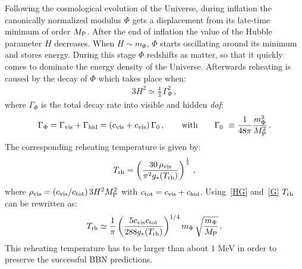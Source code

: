 \documentclass[12pt,a4paper]{book}
\begin{document}
Following the cosmological evolution of the Universe, during inflation the canonically normalized modulus $\Phi$ gets a displacement from its late-time minimum of order $M_{\rm P}$. After the end of inflation the value of the Hubble parameter $H$ decreases. When $H \sim m_\Phi$, $\Phi$ starts oscillating around its minimum and stores energy. During this stage $\Phi$ redshifts as matter, so that it quickly comes to dominate the energy density of the Universe. Afterwards reheating is caused by the decay of $\Phi$ which takes place when:
\begin{align}
3 H^2 \simeq \frac43 \,\Gamma_\Phi^2\,,
\label{HG}
\end{align}
where $\Gamma_\Phi$ is the total decay rate into visible and hidden \textit{dof}:
\begin{align}
\Gamma_\Phi = \Gamma_{\rm vis} + \Gamma_{\rm hid} = \left(c_{\rm vis} + c_{\rm vis}\right) \Gamma_0\,,\qquad\text{with} \qquad \Gamma_0~\equiv \frac{1}{48\pi}\frac{m_\Phi^3}{M_{\rm P}^2}\,.
\label{G}
\end{align}
The corresponding reheating temperature is given by:
\begin{align} 
T_{\rm rh} = \left(\frac{30\,\rho_{\rm vis}}{\pi^2 g_*(T_{\rm rh})}\right)^{\frac 14}\,,
\label{Trh}
\end{align}
where $\rho_{\rm vis} = \left(c_{\rm vis}/c_{\rm tot}\right) 3 H^2 M_{\rm P}^2$ with $c_{\rm tot}=c_{\rm vis} + c_{\rm hid}$. 
Using~\eqref{HG} and~\eqref{G} $T_{\rm rh}$ can be rewritten as:
\begin{align}
T_{\rm rh} \simeq \frac{1}{\pi} \left(\frac{5 c_{\rm vis} c_{\rm tot}}{288 g_*(T_{\rm rh})}\right)^{1/4} m_\Phi\,\sqrt{\frac{m_\Phi}{M_{\rm P}}}\,.
\label{rt}
\end{align}
This reheating temperature has to be larger than about $1$ MeV in order to preserve the successful BBN predictions.\\
\end{document}
